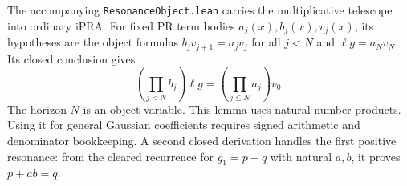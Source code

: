 The accompanying \texttt{ResonanceObject.lean} carries the multiplicative
telescope into ordinary iPRA. For fixed PR term bodies $a_j(x),b_j(x),v_j(x)$,
its hypotheses are the object formulas $b_jv_{j+1}=a_jv_j$ for all $j<N$
and $\ell g=a_Nv_N$. Its closed conclusion gives
\[
 \left(\prod_{j<N}b_j\right)\ell g=\left(\prod_{j\le N}a_j\right)v_0 .
\]
The horizon $N$ is an object variable. This lemma uses natural-number
products. Using it for general Gaussian coefficients requires signed
arithmetic and denominator bookkeeping. A second closed derivation handles
the first positive resonance: from the cleared recurrence for $g_1=p-q$
with natural $a,b$, it proves $p+ab=q$.
